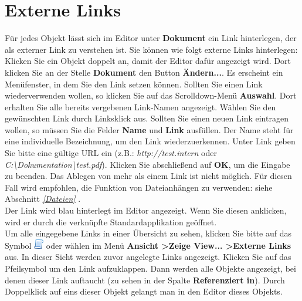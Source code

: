 \documentclass[a4paper,10pt]{book}
\begin{document}
\section{Externe Links}
Für jedes Objekt lässt sich im Editor unter \textbf{Dokument} ein Link hinterlegen, der als externer Link zu verstehen ist. Sie können wie folgt externe
Links hinterlegen: Klicken Sie ein Objekt doppelt an, damit der Editor dafür angezeigt wird. Dort klicken Sie an der Stelle \textbf{Dokument} den Button
\textbf{Ändern...}. Es erscheint ein Menüfenster, in dem Sie den Link setzen können. Sollten Sie einen Link wiederverwenden wollen, so klicken Sie auf das
Scrolldown-Menü \textbf{Auswahl}. Dort erhalten Sie alle bereits vergebenen Link-Namen angezeigt. Wählen Sie den gewünschten Link durch Linksklick aus.
Sollten Sie einen neuen Link eintragen wollen, so müssen Sie die Felder \textbf{Name} und \textbf{Link} ausfüllen. Der Name steht für eine individuelle Bezeichnung,
um den Link wiederzuerkennen. Unter Link geben Sie bitte eine gültige URL ein (z.B.: {\em http://test.intern} oder {\em C:\textbackslash Dokumentation\textbackslash test.pdf}).
Klicken Sie abschließend auf \textbf{OK}, um die Eingabe zu beenden. Das Ablegen von mehr als einem Link ist nicht möglich. Für diesen Fall wird empfohlen,
die Funktion von Dateianhängen zu verwenden: siehe Abschnitt {\em \ref{Dateien} }.
\newline\\
Der Link wird blau hinterlegt im Editor angezeigt. Wenn Sie diesen anklicken, wird er durch die verknüpfte Standardapplikation geöffnet.
\newline\\
Um alle eingegebene Links in einer Übersicht zu sehen, klicken Sie bitte auf das Symbol \includegraphics[height=2ex]{Icon/Richtlinien.png} oder wählen im Menü
\textbf{Ansicht \textgreater Zeige View... \textgreater Externe Links} aus. In dieser Sicht werden zuvor angelegte Links angezeigt. Klicken Sie auf das Pfeilsymbol um
den Link aufzuklappen. Dann werden alle Objekte angezeigt, bei denen dieser Link auftaucht (zu sehen in der Spalte \textbf{Referenziert in}).
Durch Doppelklick auf eins dieser Objekt gelangt man in den Editor dieses Objekts.
\end{document}
